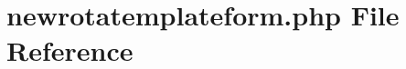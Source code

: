 \hypertarget{newrotatemplateform_8php}{}\section{newrotatemplateform.\+php File Reference}
\label{newrotatemplateform_8php}
